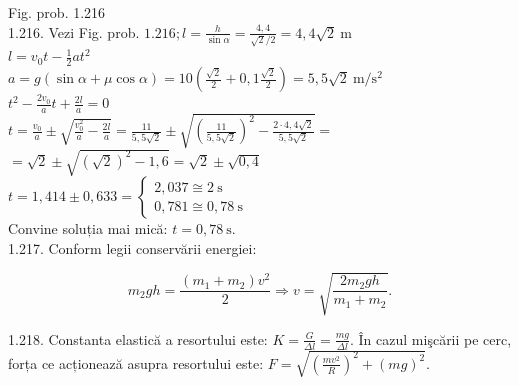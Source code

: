 \documentclass[10pt]{article}
\begin{document}
Fig. prob. 1.216\\
1.216. Vezi Fig. prob. $1.216 ; l=\frac{h}{\sin \alpha}=\frac{4,4}{\sqrt{2} / 2}=4,4 \sqrt{2} \mathrm{~m}$\\
$l=v_{0} t-\frac{1}{2} a t^{2}$\\
$a=g(\sin \alpha+\mu \cos \alpha)=10\left(\frac{\sqrt{2}}{2}+0,1 \frac{\sqrt{2}}{2}\right)=5,5 \sqrt{2} \mathrm{~m} / \mathrm{s}^{2}$\\
$t^{2}-\frac{2 v_{0}}{a} t+\frac{2 l}{a}=0$\\
$t=\frac{v_{0}}{a} \pm \sqrt{\frac{v_{0}^{2}}{a}-\frac{2 l}{a}}=\frac{11}{5,5 \sqrt{2}} \pm \sqrt{\left(\frac{11}{5,5 \sqrt{2}}\right)^{2}-\frac{2 \cdot 4,4 \sqrt{2}}{5,5 \sqrt{2}}}=$\\
$=\sqrt{2} \pm \sqrt{(\sqrt{2})^{2}-1,6}=\sqrt{2} \pm \sqrt{0,4}$\\
$t=1,414 \pm 0,633=\left\{\begin{array}{l}2,037 \cong 2 \mathrm{~s} \\ 0,781 \cong 0,78 \mathrm{~s}\end{array}\right.$\\
Convine soluția mai mică: $t=0,78 \mathrm{~s}$.\\
1.217. Conform legii conservării energiei:

$$
m_{2} g h=\frac{\left(m_{1}+m_{2}\right) v^{2}}{2} \Rightarrow v=\sqrt{\frac{2 m_{2} g h}{m_{1}+m_{2}}} .
$$

1.218. Constanta elastică a resortului este: $K=\frac{G}{\Delta l}=\frac{m g}{\Delta l}$. În cazul mişcării pe cerc, forța ce acționează asupra resortului este: $F=\sqrt{\left(\frac{m v^{2}}{R}\right)^{2}+(m g)^{2}}$.
\end{document}

